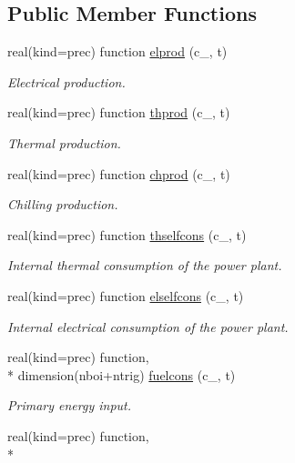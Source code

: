 \subsection*{Public Member Functions}
\begin{DoxyCompactItemize}
\item 
real(kind=prec) function \hyperlink{classenergy_a5ce8ae58805b4f7abe840bedaea30a00}{elprod} (c\-\_\-, t)
\begin{DoxyCompactList}\small\item\em Electrical production. \end{DoxyCompactList}\item 
real(kind=prec) function \hyperlink{classenergy_a40ddda3c07be743826be8c2e982b9b98}{thprod} (c\-\_\-, t)
\begin{DoxyCompactList}\small\item\em Thermal production. \end{DoxyCompactList}\item 
real(kind=prec) function \hyperlink{classenergy_a78e3e5b7396e41d13b3c9aa8f4edca48}{chprod} (c\-\_\-, t)
\begin{DoxyCompactList}\small\item\em Chilling production. \end{DoxyCompactList}\item 
real(kind=prec) function \hyperlink{classenergy_af385040819d802e1a3c9e0c9a692ff0a}{thselfcons} (c\-\_\-, t)
\begin{DoxyCompactList}\small\item\em Internal thermal consumption of the power plant. \end{DoxyCompactList}\item 
real(kind=prec) function \hyperlink{classenergy_af5299e75015a3803765a6b49efa22049}{elselfcons} (c\-\_\-, t)
\begin{DoxyCompactList}\small\item\em Internal electrical consumption of the power plant. \end{DoxyCompactList}\item 
real(kind=prec) function, \\*
dimension(nboi+ntrig) \hyperlink{classenergy_a07a977e68ea1d19da65ba06a4e4007a2}{fuelcons} (c\-\_\-, t)
\begin{DoxyCompactList}\small\item\em Primary energy input. \end{DoxyCompactList}\item 
real(kind=prec) function, \\*

\end{DoxyCompactItemize}
